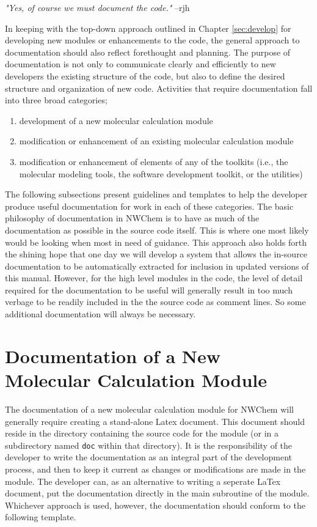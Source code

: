 \label{sec:newdoc}


{\em "Yes, of course we must document the code."}  --rjh

In keeping with the top-down approach outlined in Chapter \ref{sec:develop}
for developing new modules or enhancements to the code, the general
approach to documentation should also reflect forethought and planning.
The purpose of documentation is not only to communicate clearly and efficiently
to new developers the existing structure of the code, but also to define the desired
structure and organization of new code.  Activities that require documentation
fall into three broad categories;

\begin{enumerate}
\item development of a new molecular calculation module
\item modification or enhancement of an existing molecular calculation module
\item modification or enhancement of elements of any of the toolkits 
(i.e., the molecular modeling
tools, the software development toolkit, or the utilities)
\end{enumerate}

The following subsections present guidelines and templates 
to help the developer produce useful documentation for work in each of
these categories.  The basic philosophy of documentation in NWChem 
is to have as much of the documentation as possible in the source code itself.
This is where one most likely would be looking when most in
need of guidance.  This approach also holds forth the shining hope that
one day we will develop a system that allows the in-source documentation
to be automatically extracted for inclusion in updated versions of
this manual.  However, for the high level modules in the code, the level
of detail required for the documentation to be useful will generally
result in too much verbage to be readily included in the the source code as
comment lines.  So some
additional documentation will always be necessary.

\section{Documentation of a New Molecular Calculation Module}
\label{sec:standalone}

The documentation of a new molecular calculation module for NWChem will generally
require creating a stand-alone Latex document.  This document should reside
in the directory containing the source code for the module (or in a subdirectory
named {\tt doc} within that directory).  It is the responsibility of the
developer to write the documentation as an integral part of the development
process, and then to keep it current as changes or modifications are made
in the module.  The developer can, as an alternative to writing a seperate
LaTex document, put the documentation directly in the main subroutine of
the module.  Whichever approach is used, however, the documentation should
conform to the following template.

